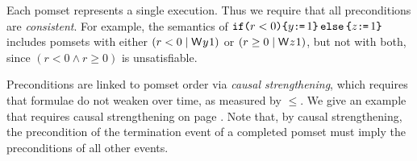 
Each pomset represents a single execution.  Thus we require that all
preconditions are \emph{consistent}.  For example, the semantics of
$\texttt{if}\allowbreak\texttt{(}r<0\texttt{)}\allowbreak\texttt{\{} y\texttt{:}\mkern-1mu\texttt{=}\,1 \texttt{\}}\,\allowbreak\texttt{else}\allowbreak\,\texttt{\{} z\texttt{:}\mkern-1mu\texttt{=}\,1\texttt{\}}$ includes pomsets with either
$(r<0\mid\DW{y}{1})$ or $(r\geq0\mid\DW{z}{1})$, but not with both, since
$(r<0\land r\geq0)$ is unsatisfiable.

Preconditions are linked to pomset order via \emph{causal strengthening},
which requires that formulae do not weaken over time, as measured by $\le$.
We give an example that requires causal strengthening on page \pageref{page:strengthening}.
Note that, by causal strengthening, the precondition of the termination event
of a completed pomset must imply the preconditions of all other events.

